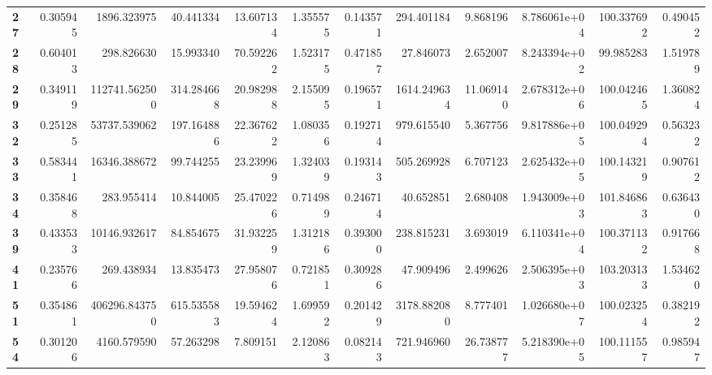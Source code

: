 \begin{table}[h]
\begin{tabular}{lrrrrrrrrrrr}
\textbf{27} &  0.305945 &    1896.323975 &       40.441334 &                  13.607134 &  1.355575 &  0.143571 &   294.401184 &   9.868196 &  8.786061e+04 &  100.337692 &     0.490452 \\
\textbf{28} &  0.604013 &     298.826630 &       15.993340 &                  70.592262 &  1.523175 &  0.471857 &    27.846073 &   2.652007 &  8.243394e+02 &   99.985283 &     1.519789 \\
\textbf{29} &  0.349119 &  112741.562500 &      314.284668 &                  20.982988 &  2.155095 &  0.196571 &  1614.249634 &  11.069140 &  2.678312e+06 &  100.042465 &     1.360824 \\
\textbf{32} &  0.251285 &   53737.539062 &      197.164886 &                  22.367622 &  1.080356 &  0.192714 &   979.615540 &   5.367756 &  9.817886e+05 &  100.049294 &     0.563232 \\
\textbf{33} &  0.583441 &   16346.388672 &       99.744255 &                  23.239969 &  1.324039 &  0.193143 &   505.269928 &   6.707123 &  2.625432e+05 &  100.143219 &     0.907612 \\
\textbf{34} &  0.358468 &     283.955414 &       10.844005 &                  25.470226 &  0.714989 &  0.246714 &    40.652851 &   2.680408 &  1.943009e+03 &  101.846863 &     0.636430 \\
\textbf{39} &  0.433533 &   10146.932617 &       84.854675 &                  31.932259 &  1.312186 &  0.393000 &   238.815231 &   3.693019 &  6.110341e+04 &  100.371132 &     0.917668 \\
\textbf{41} &  0.235766 &     269.438934 &       13.835473 &                  27.958076 &  0.721851 &  0.309286 &    47.909496 &   2.499626 &  2.506395e+03 &  103.203133 &     1.534620 \\
\textbf{51} &  0.354861 &  406296.843750 &      615.535583 &                  19.594624 &  1.699592 &  0.201429 &  3178.882080 &   8.777401 &  1.026680e+07 &  100.023254 &     0.382192 \\
\textbf{54} &  0.301206 &    4160.579590 &       57.263298 &                   7.809151 &  2.120863 &  0.082143 &   721.946960 &  26.738777 &  5.218390e+05 &  100.111557 &     0.985947 \\
\bottomrule
\end{tabular}
\end{table}
